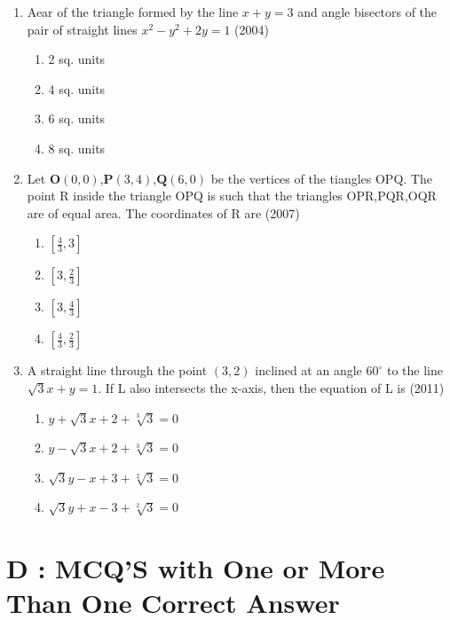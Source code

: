 \documentclass[12pt]{article}
\providecommand{\sbrak}[1]{\ensuremath{{}\left[#1\right]}}
\let\vec\mathbf
\begin{document}
\begin{enumerate}
\item Aear of the triangle formed by the line $x+y=3$ and angle bisectors of the pair of straight lines $x^2-y^2+2y=1$ (2004)
\begin{enumerate}
\item 2 sq. units  
\item 4 sq. units 
\item 6 sq. units    
\item 8 sq. units
\end{enumerate}
\item Let $\vec{O}(0,0)$,$\vec{P}(3,4)$,$\vec{Q}(6,0)$ be the vertices of the tiangles OPQ. The point R inside the triangle OPQ is such that the triangles OPR,PQR,OQR are of equal area. The coordinates of R are   (2007)
\begin{enumerate}
\item $\sbrak{\frac{4}{3}, 3}$   
\item $\sbrak{3,\frac{2}{3}}$  
\item $\sbrak{3,\frac{4}{3}}$  
\item $\sbrak{\frac{4}{3},\frac{2}{3}}$
\end{enumerate}
\item A straight line through the point $(3,2)$ inclined at an angle $60^\circ$  to the line $\sqrt{3}x+y=1$. If L also intersects the x-axis, then the equation of L is   (2011)
\begin{enumerate}
\item $y+\sqrt{3}x+2+\sqrt[3]{3}=0$
\item $y-\sqrt{3}x+2+\sqrt[3]{3}=0$ 
\item $\sqrt{3}y-x+3+\sqrt[2]{3}=0$  
\item $\sqrt{3}y+x-3+\sqrt[2]{3}=0$
\end{enumerate}
\end{enumerate}
\section*{D  :  MCQ'S with One or More Than One Correct Answer}
\end{document}
